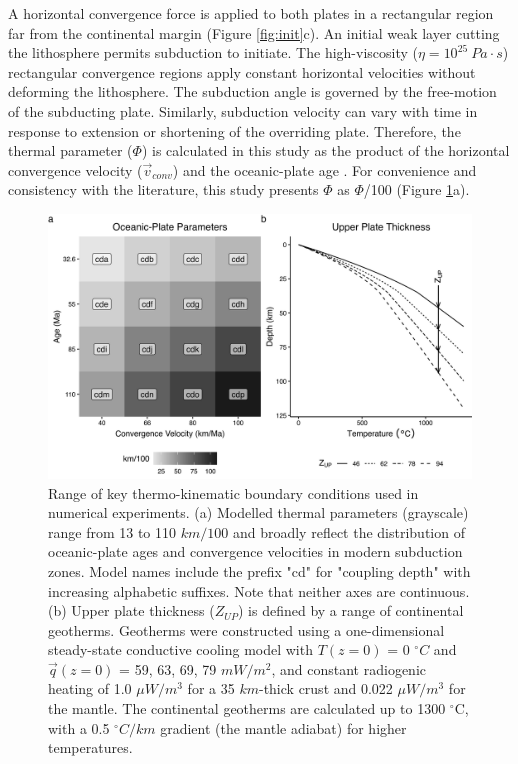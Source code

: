 A horizontal convergence force is applied to both plates in a rectangular region far from the continental margin (Figure \ref{fig:init}c). An initial weak layer cutting the lithosphere permits subduction to initiate. The high-viscosity (\(\eta = 10^{25}~Pa\cdot s\)) rectangular convergence regions apply constant horizontal velocities without deforming the lithosphere. The subduction angle is governed by the free-motion of the subducting plate. Similarly, subduction velocity can vary with time in response to extension or shortening of the overriding plate. Therefore, the thermal parameter (\(\Phi\)) is calculated in this study as the product of the horizontal convergence velocity (\(\vec{v}_{conv}\)) and the oceanic-plate age \citep[\(t_{OP}\), c.f.][]{McKenzie1969}. For convenience and consistency with the literature, this study presents \(\Phi\) as \(\Phi\)/100 (Figure \ref{fig:params}a).

\begin{figure}[htbp]

{\centering \includegraphics[width=1\linewidth,]{assets/figs/chpt2/fig2} 

}

\caption[Range of key thermo-kinematic boundary conditions used in numerical experiments]{Range of key thermo-kinematic boundary conditions used in numerical experiments. (a) Modelled thermal parameters (grayscale) range from 13 to 110 $km/100$ and broadly reflect the distribution of oceanic-plate ages and convergence velocities in modern subduction zones. Model names include the prefix "cd" for "coupling depth" with increasing alphabetic suffixes. Note that neither axes are continuous. (b) Upper plate thickness ($Z_{UP}$) is defined by a range of continental geotherms. Geotherms were constructed using a one-dimensional steady-state conductive cooling model with $T(z=0)$ = 0 $^{\circ}C$ and $\vec{q}(z=0)$ = 59, 63, 69, 79 $mW/m^2$, and constant radiogenic heating of 1.0 $\mu W/m^3$ for a 35 $km$-thick crust and 0.022 $\mu W/m^3$ for the mantle. The continental geotherms are calculated up to 1300 $^{\circ}$C, with a 0.5 $^{\circ}C/km$ gradient (the mantle adiabat) for higher temperatures.}\label{fig:params}
\end{figure}

